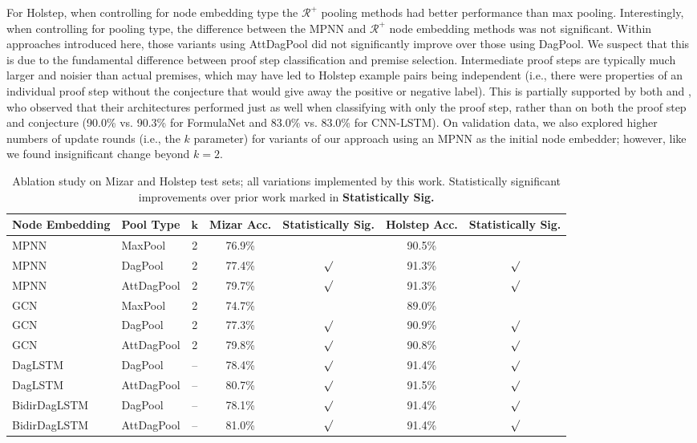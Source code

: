 \documentclass{article}
\begin{document}
For Holstep, when controlling for node embedding type the $\mathcal{R}^+$ pooling methods had better performance than max pooling. Interestingly, when controlling for pooling type, the difference between the MPNN and $\mathcal{R}^+$ node embedding methods was not significant. Within approaches introduced here, those variants using AttDagPool did not significantly improve over those using DagPool.
We suspect that this is due to the fundamental difference between proof step classification and premise selection. Intermediate proof steps are typically much larger and noisier than actual premises, which may have led to Holstep example pairs being independent (i.e., there were properties of an individual proof step without the conjecture that would give away the positive or negative label). This is partially supported by both \cite{wang2017premise} and \cite{kaliszyk2017holstep}, who observed that their architectures performed just as well when classifying with only the proof step, rather than on both the proof step and conjecture (90.0\% vs. 90.3\% for FormulaNet and 83.0\% vs. 83.0\% for CNN-LSTM). On validation data, we also explored higher numbers of update rounds (i.e., the $k$ parameter) for variants of our approach using an MPNN as the initial node embedder; however, like \cite{wang2017premise} we found insignificant change beyond $k = 2$.

\begin{table}[t]
\centering
\caption{Ablation study on Mizar and Holstep test sets; all variations implemented by this work. Statistically significant improvements over prior work marked in \textbf{Statistically Sig.}
}
\vskip 0.1in
\label{res:exp_abl}
\footnotesize
\setlength\tabcolsep{4pt}\begin{tabular}{ l l c !{\vrule} c c !{\vrule} c c }
\toprule 
  \textbf{Node Embedding} & \textbf{Pool Type} & $\boldsymbol{k}$ & \textbf{Mizar Acc.} & \textbf{Statistically Sig.} & \textbf{Holstep Acc.} & \textbf{Statistically Sig.}  \\
\midrule
MPNN & MaxPool & 2 & 76.9\% & & 90.5\%  &  \\ 
  MPNN & DagPool & 2 & 77.4\% & $\surd$ & 91.3\%  & $\surd$ \\ 
  MPNN & AttDagPool & 2 & 79.7\% & $\surd$ & 91.3\% & $\surd$ \\ 
GCN & MaxPool & 2 & 74.7\% & & 89.0\% & \\ 
GCN & DagPool & 2 & 77.3\% & $\surd$ & 90.9\%  & $\surd$ \\ 
  GCN & AttDagPool & 2 & 79.8\% & $\surd$ & 90.8\% & $\surd$ \\ 
DagLSTM & DagPool & -- & 78.4\% & $\surd$ & 91.4\% & $\surd$ \\ 
DagLSTM & AttDagPool & -- & 80.7\% & $\surd$ & 91.5\% & $\surd$  \\ 
BidirDagLSTM & DagPool & -- & 78.1\% & $\surd$ & 91.4\%  & $\surd$  \\ 
BidirDagLSTM & AttDagPool & -- & 81.0\% & $\surd$ & 91.4\% & $\surd$ \\ 
\bottomrule
\end{tabular}
\vspace{-0.1in}
\end{table}
\end{document}

